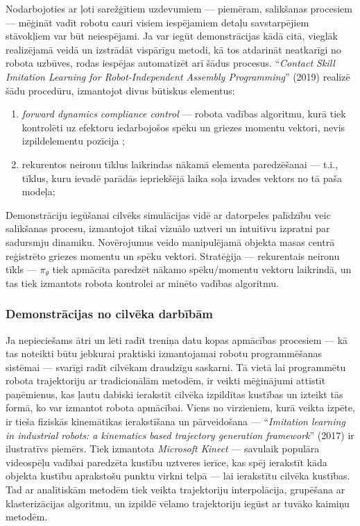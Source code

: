 \documentclass[12pt, a4paper]{article}
\numberwithin{equation}{section} %
\begin{document}
Nodarbojoties ar ļoti sarežģītiem uzdevumiem --- piemēram, salikšanas procesiem --- mēģināt vadīt robotu cauri visiem iespējamiem detaļu savstarpējiem stāvokļiem var būt neiespējami. Ja var iegūt demonstrācijas kādā citā, vieglāk realizējamā veidā un izstrādāt vispārīgu metodi, kā tos atdarināt neatkarīgi no robota uzbūves, rodas iespējas automatizēt arī šādus procesus. ``\textit{Contact Skill Imitation Learning for Robot-Independent Assembly Programming}'' \cite{scherzinger2019contact} (2019) realizē šādu procedūru, izmantojot divus būtiskus elementus:

\begin{enumerate}
    \item \textit{forward dynamics compliance control} --- robota vadības algoritmu, kurā tiek kontrolēti uz efektoru iedarbojošos spēku un griezes momentu vektori, nevis izpildelementu pozīcija \cite{scherzinger2017forward};
    \item rekurentos neironu tīklus laikrindas nākamā elementa paredzēšanai --- t.i., tīklus, kuru ievadē parādās iepriekšējā laika soļa izvades vektors no tā paša modeļa;
\end{enumerate}

Demonstrāciju iegūšanai cilvēks simulācijas vidē ar datorpeles palīdzību veic salikšanas procesu, izmantojot tikai vizuālo uztveri un intuitīvu izpratni par sadursmju dinamiku. Novērojumus veido manipulējamā objekta masas centrā reģistrēto griezes momentu un spēku vektori. Stratēģija --- rekurentais neironu tīkls --- $\pi_{\theta}$ tiek apmācīta paredzēt nākamo spēku/momentu vektoru laikrindā, un tas tiek izmantots robota kontrolei ar minēto vadības algoritmu.

\subsubsection{Demonstrācijas no cilvēka darbībām}

Ja nepieciešams ātri un lēti radīt treniņa datu kopas apmācības procesiem --- kā tas noteikti būtu jebkurai praktiski izmantojamai robotu programmēšanas sistēmai --- svarīgi radīt cilvēkam draudzīgu saskarni. Tā vietā lai programmētu robota trajektoriju ar tradicionālām metodēm, ir veikti mēģinājumi attīstīt paņēmienus, kas ļautu dabiski ierakstīt cilvēka izpildītas kustības un izteikt tās formā, ko var izmantot robota apmācībai. Viens no virzieniem, kurā veikta izpēte, ir tieša fiziskās kinemātikas ierakstīšana un pārveidošana --- ``\textit{Imitation learning in industrial robots: a kinematics based trajectory generation framework}'' \cite{jha2017imitation} (2017) ir ilustratīvs piemērs. Tiek izmantota \textit{Microsoft Kinect} --- savulaik populāra videospēļu vadībai paredzēta kustību uztveres ierīce, kas spēj ierakstīt kāda objekta kustību aprakstošu punktu virkni telpā --- lai ierakstītu cilvēka kustības. Tad ar analītiskām metodēm tiek veikta trajektoriju interpolācija, grupēšana ar klasterizācijas algoritmu, un izpildē vēlamo trajektoriju iegūst ar tuvāko kaimiņu metodēm.
\end{document}
